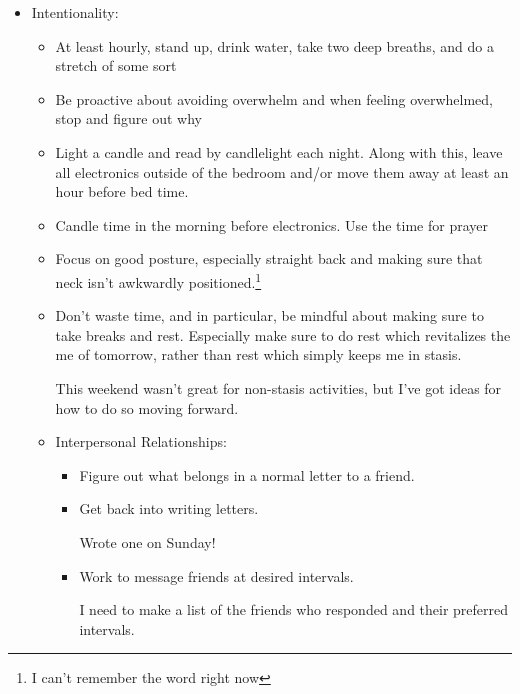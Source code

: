 \documentclass[12pt]{article}[titlepage]
\renewcommand{\,}{\textsuperscript{,}}
\begin{document}
\begin{itemize}   
\item Intentionality:  
\begin{itemize}  
\item At least hourly, stand up, drink water, take two deep breaths, and do a stretch of some sort  
\item Be proactive about avoiding overwhelm and when feeling overwhelmed, stop and figure out why  
\item Light a candle and read by candlelight each night. Along with this, leave all electronics outside of the bedroom and/or move them away at least an hour before bed time.  
\item Candle time in the morning before electronics. Use the time for prayer  
\item Focus on good posture, especially straight back and making sure that neck isn't awkwardly positioned.\footnote{I can't remember the word right now}

\item Don't waste time, and in particular, be mindful about making sure to take breaks and rest. Especially make sure to do rest which revitalizes the me of tomorrow, rather than rest which simply keeps me in stasis.

This weekend wasn't great for non-stasis activities, but I've got ideas for how to do so moving forward.

\item Interpersonal Relationships:  
\begin{itemize}   
\item Figure out what belongs in a normal letter to a friend.  
\item Get back into writing letters.

Wrote one on Sunday!  
\item Work to message friends at desired intervals.

I need to make a list of the friends who responded and their preferred intervals.  
\end{itemize}


\end{itemize}
\end{itemize}
\end{document}
